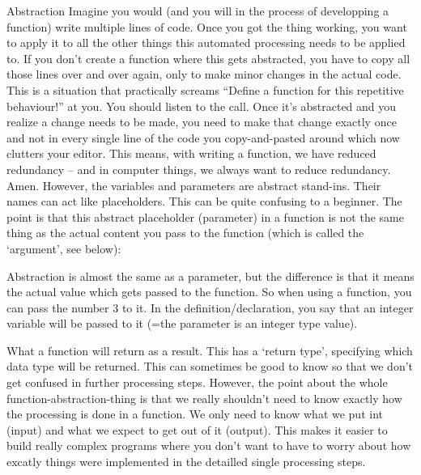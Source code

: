 \documentclass[10pt,a4paper]{article}
\begin{document}
\begin{multicols}{3}
\begin{textbox}{Abstraction}
Imagine you would (and you will in the process of developping a function) write multiple lines of code. Once you got the thing working, you want to apply it to all the other things this automated processing needs to be applied to. If you don't create a function where this gets abstracted, you have to copy all those lines over and over again, only to make minor changes in the actual code. This is a situation that practically screams ``Define a function for this repetitive behaviour!'' at you. You should listen to the call. Once it's abstracted and you realize a change needs to be made, you need to make that change exactly once and not in every single line of the code you copy-and-pasted around which now clutters your editor. This means, with writing a function, we have reduced redundancy -- and in computer things, we always want to reduce redundancy. Amen. However, the variables and parameters are abstract stand-ins. Their names can act like placeholders. This can be quite confusing to a beginner. The point is that this abstract placeholder (parameter) in a function is not the same thing as the actual content you pass to the function (which is called the `argument', see below):
\end{textbox}

\begin{textbox}{Abstraction}
 is almost the same as a parameter, but the difference is that it means the actual value which gets passed to the function. So when using a function, you can pass the number 3 to it. In the definition/declaration, you say that an integer variable will be passed to it (=the parameter is an integer type value). 

 What a function will return as a result. This has a `return type', specifying which data type will be returned.  This can sometimes be good to know so that we don't get confused in further processing steps. However, the point about the whole function-abstraction-thing is that we really shouldn't need to know exactly how the processing is done in a function. We only need to know what we put int (input) and what we expect to get out of it (output). This makes it easier to build really complex programs where you don't want to have to worry about how excatly things were implemented in the detailled single processing steps.
\end{textbox}


\end{multicols}
\end{document}
